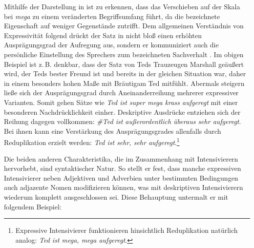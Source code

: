 \noindent Mithilfe der Darstellung in  ist zu erkennen, dass das Verschieben auf der Skala bei \textit{mega} zu einem veränderten Begriffsumfang führt, da die bezeichnete Eigenschaft auf weniger Gegenstände zutrifft. Dem allgemeinen Verständnis von Expressivität folgend drückt der Satz in  nicht bloß einen erhöhten Ausprägungsgrad der Aufregung aus, sondern er kommuniziert auch die persönliche Einstellung des Sprechers zum bezeichneten Sachverhalt \citep[vgl.][19]{Gutzmann.2019a}. Im obigen Beispiel ist z.\,B. denkbar, dass der Satz von Teds Trauzeugen Marshall geäußert wird, der Teds bester Freund ist und bereits in der gleichen Situation war, daher in einem besonders hohen Maße mit Bräutigam Ted mitfühlt. Abermals steigern ließe sich der Ausprägungsgrad durch Aneinanderreihung mehrerer expressiver Varianten. Somit gehen Sätze wie \textit{Ted ist super mega krass aufgeregt} mit einer besonderen Nachdrücklichkeit einher. Deskriptive Ausdrücke entziehen sich der Reihung dagegen vollkommen: \textit{\#Ted ist außerordentlich überaus sehr aufgeregt}. Bei ihnen kann eine Verstärkung des Ausprägungsgrades allenfalls durch Reduplikation erzielt werden: \textit{Ted ist sehr, sehr aufgeregt}.\footnote{Expressive Intensivierer funktionieren hinsichtlich Reduplikation natürlich analog: \textit{Ted ist mega, mega aufgeregt}.}

Die beiden anderen Charakteristika, die \citet[]{Gutzmann.2019a} im Zusammenhang mit Intensivierern hervorhebt, sind syntaktischer Natur. So stellt er fest, dass manche expressiven Intensivierer neben Adjektiven und Adverbien unter bestimmten Bedingungen auch adjazente Nomen modifizieren können, was mit deskriptiven Intensivierern wiederum komplett ausgeschlossen sei. Diese Behauptung untermalt er mit folgendem Beispiel:

